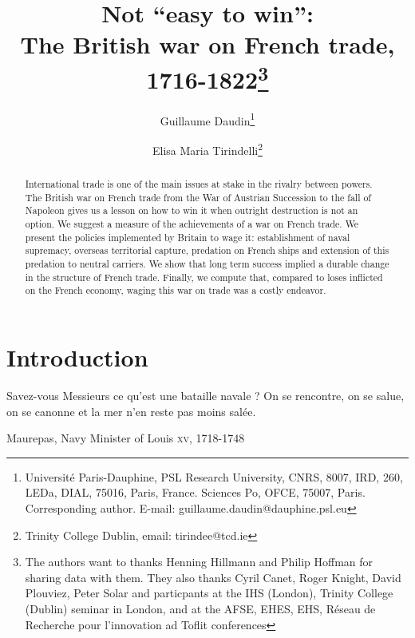 \documentclass[12pt,a4paper,notitlepage,english]{article}
\author{
  Guillaume Daudin\thanks{Université Paris-Dauphine, PSL Research University, CNRS, 8007, IRD, 260, LEDa, DIAL, 75016, Paris, France. Sciences Po, OFCE, 75007, Paris. Corresponding author. E-mail: guillaume.daudin@dauphine.psl.eu}
  \and
  Elisa Maria Tirindelli\thanks{Trinity College Dublin, email: tirindee@tcd.ie}
}
\title{Not “easy to win”: \\ The British war on French trade, 1716-1822\thanks{The authors want to thanks Henning Hillmann and Philip Hoffman for sharing data with them. They also thanks Cyril Canet, Roger Knight, David Plouviez, Peter Solar and particpants at the IHS (London), Trinity College (Dublin) seminar in London, and at the AFSE, EHES, EHS, Réseau de Recherche pour l’innovation ad Toflit conferences}}
\date{}
\begin{document}
\maketitle


\begin{abstract}
International trade is one of the main issues at stake in the rivalry between powers. The
British war on French trade from the War of Austrian Succession to the fall of Napoleon gives
us a lesson on how to win it when outright destruction is not an option. We suggest a measure
of the achievements of a war on French trade. We present the policies implemented by Britain
to wage it: establishment of naval supremacy, overseas territorial capture, predation on French
ships and extension of this predation to neutral carriers. We show that long term success implied
a durable change in the structure of French trade. Finally, we compute that, compared to loses
inflicted on the French economy, waging this war on trade was a costly endeavor.
\end{abstract}


\section{Introduction} \label{introduction}

\epigraph{Savez-vous Messieurs ce qu’est une bataille navale ? On se rencontre, on se salue, on se canonne et la mer n’en reste pas moins salée.}{Maurepas, Navy Minister of Louis  \textsc{xv}, 1718-1748}

\maketitle
\end{document}
